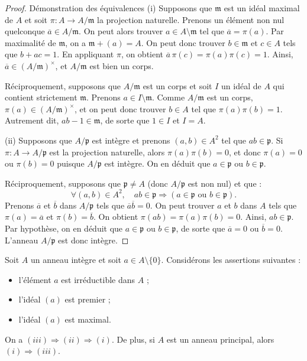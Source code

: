 \documentclass[]{report}
\begin{document}
\begin{proof}{Démonstration des équivalences}
    (i) Supposons que $\mathfrak{m}$ est un idéal maximal de $A$ et soit $\pi : A \to A/\mathfrak{m}$ la projection naturelle. Prenons un élément non nul quelconque $\overline{a} \in A/\mathfrak{m}$. On peut alors trouver $a \in A \setminus \mathfrak{m}$ tel que $\overline{a} = \pi(a)$. Par maximalité de $\mathfrak{m}$, on a $\mathfrak{m} + (a) = A$. On peut donc trouver $b \in \mathfrak{m}$ et $c \in A$ tels que $b + ac = 1$. En appliquant $\pi$, on obtient $\overline{a} \, \pi(c) = \pi(a)\pi(c) = 1$. Ainsi, $\overline{a} \in (A/\mathfrak{m})^{\times}$, et $A/\mathfrak{m}$ est bien un corps.

    Réciproquement, supposons que $A/\mathfrak{m}$ est un corps et soit $I$ un idéal de $A$ qui contient strictement $\mathfrak{m}$. Prenons $a \in I \setminus \mathfrak{m}$. Comme $A/\mathfrak{m}$ est un corps, $\pi(a) \in (A/\mathfrak{m})^{\times}$, et on peut donc trouver $b \in A$ tel que $\pi(a)\pi(b) = 1$. Autrement dit, $ab - 1 \in \mathfrak{m}$, de sorte que $1 \in I$ et $I = A$.

    (ii) Supposons que $A/\mathfrak{p}$ est intègre et prenons $(a, b) \in A^2$ tel que $ab \in \mathfrak{p}$. Si $\pi : A \to A/\mathfrak{p}$ est la projection naturelle, alors $\pi(a)\pi(b) = 0$, et donc $\pi(a) = 0$ ou $\pi(b) = 0$ puisque $A/\mathfrak{p}$ est intègre. On en déduit que $a \in \mathfrak{p}$ ou $b \in \mathfrak{p}$.

    Réciproquement, supposons que $\mathfrak{p} \neq A$ (donc $A/\mathfrak{p}$ est non nul) et que :
    \[\forall (a, b) \in A^2, \quad ab \in \mathfrak{p} \Rightarrow (a \in \mathfrak{p} \text{ ou } b \in \mathfrak{p}).\]
    Prenons $\overline{a}$ et $\overline{b}$ dans $A/\mathfrak{p}$ tels que $\overline{a}\overline{b} = 0$. On peut trouver $a$ et $b$ dans $A$ tels que $\pi(a) = \overline{a}$ et $\pi(b) = \overline{b}$. On obtient $\pi(ab) = \pi(a)\pi(b) = 0$. Ainsi, $ab \in \mathfrak{p}$. Par hypothèse, on en déduit que $a \in \mathfrak{p}$ ou $b \in \mathfrak{p}$, de sorte que $\overline{a} = 0$ ou $\overline{b} = 0$. L'anneau $A/\mathfrak{p}$ est donc intègre.
\end{proof}

\begin{prop}{}{}
    Soit $A$ un anneau intègre et soit $a \in A \setminus \{0\}$. Considérons les assertions suivantes :
    \begin{itemize}
        \item[(i)] l'élément $a$ est irréductible dans $A$ ;
        \item[(ii)] l'idéal $(a)$ est premier ;
        \item[(iii)] l'idéal $(a)$ est maximal.
    \end{itemize}
    On a $(iii) \Rightarrow (ii) \Rightarrow (i)$. De plus, si $A$ est un anneau principal, alors $(i) \Rightarrow (iii)$.
\end{prop}
\end{document}

